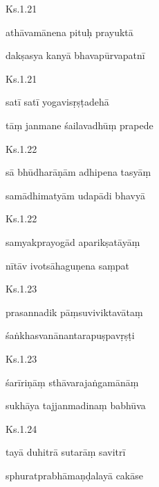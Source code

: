 \documentclass{tufte-handout}
\newenvironment{sanskrit}%
{\begin{otherlanguage}{sanskrit-devanagari}}%
{\end{otherlanguage}}
\begin{document}
    
	\begin{sanskrit}
	
	    
		Ks.1.21 
    
	    
		athāvamānena pituḥ prayuktā 
    
	    
		dakṣasya kanyā bhavapūrvapatnī 
    
	\end{sanskrit}

    
	\begin{sanskrit}
	
	    
		Ks.1.21 
    
	    
		satī satī yogavisṛṣṭadehā 
    
	    
		tāṃ janmane śailavadhūṃ prapede 
    
	\end{sanskrit}

    
	\begin{sanskrit}
	
	    
		Ks.1.22 
    
	    
		sā bhūdharāṇām adhipena tasyāṃ 
    
	    
		samādhimatyām udapādi bhavyā 
    
	\end{sanskrit}

    
	\begin{sanskrit}
	
	    
		Ks.1.22 
    
	    
		samyakprayogād aparikṣatāyāṃ 
    
	    
		nītāv ivotsāhaguṇena saṃpat 
    
	\end{sanskrit}

    
	\begin{sanskrit}
	
	    
		Ks.1.23 
    
	    
		prasannadik pāṃsuviviktavātaṃ 
    
	    
		śaṅkhasvanānantarapuṣpavṛṣṭi 
    
	\end{sanskrit}

    
	\begin{sanskrit}
	
	    
		Ks.1.23 
    
	    
		śarīriṇāṃ sthāvarajaṅgamānāṃ 
    
	    
		sukhāya tajjanmadinaṃ babhūva 
    
	\end{sanskrit}

    
	\begin{sanskrit}
	
	    
		Ks.1.24 
    
	    
		tayā duhitrā sutarāṃ savitrī 
    
	    
		sphuratprabhāmaṇḍalayā cakāse 
    
	\end{sanskrit}
\end{document}
